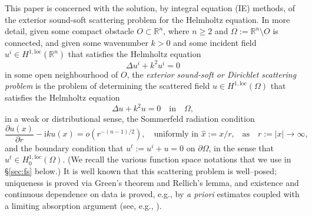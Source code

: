 \documentclass{birkjour}
\theoremstyle{definition}
\theoremstyle{remark}
\numberwithin{equation}{section}
\newcommand{\R}{\mathbb{R}}
\newcommand{\Hol}{H^{1,\mathrm{loc}}}
\newcommand{\Hmc}{H^{-1}_{\mathrm{comp}}}
\newcommand{\ri}{\mathrm{i}}
\newcommand{\cA}{\mathcal{A}}
\newcommand{\supp}{\mathrm{supp}}
\begin{document}
This paper is concerned with the solution, by integral equation (IE) methods, of the exterior sound-soft scattering problem for the Helmholtz equation. In more detail, given some compact obstacle $O\subset \R^n$, where $n\geq 2$ and $\Omega:= \R^n\setminus O$ is connected, and given some wavenumber $k>0$ and some incident field $u^i\in \Hol(\R^n)$ that satisfies the Helmholtz equation
\begin{equation} \label{eq:he0}
\Delta u^i+k^2u^i=0
\end{equation}
in some open neighbourhood
 of $O$, the {\em exterior sound-soft or Dirichlet scattering problem} is the problem of determining the scattered  field $u\in \Hol(\Omega)$ that satisfies the Helmholtz equation
\begin{equation} \label{eq:he}
\Delta u + k^2 u = 0 \quad \mbox{in} \quad \Omega,
\end{equation}
 in a weak or distributional sense,
the Sommerfeld radiation condition
\begin{equation} \label{eq:src}
\frac{\partial u(x)}{\partial r} - \ri k u(x) = o(r^{-(n-1)/2}),  \quad \mbox{uniformly in $\widehat x := x/r$,}\quad \mbox{as} \quad r:= |x|\to \infty,
\end{equation}
 and  the boundary condition  that $u^t:= u^i+u=0$ on $\partial \Omega$, in the sense that $u^t\in \Hol_0(\Omega)$. (We recall the various function space notations that we use in \S\ref{sec:fs} below.)
It is well known that this scattering problem is well--posed;  uniqueness is proved via Green's theorem and Rellich's lemma, and existence and continuous dependence on data is proved, e.g., by {\em a priori} estimates coupled with a limiting absorption argument (see, e.g., \cite{wilcox1975,NR87,mclean2000strongly}). 
\end{document}
